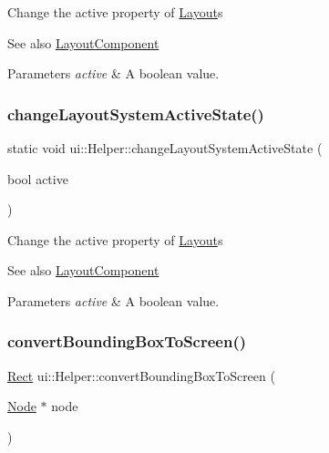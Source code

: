 Change the active property of \hyperlink{classui_1_1Layout}{Layout}\textquotesingle{}s \begin{DoxySeeAlso}{See also}
{\ttfamily \hyperlink{classui_1_1LayoutComponent}{Layout\+Component}} 
\end{DoxySeeAlso}

\begin{DoxyParams}{Parameters}
{\em active} & A boolean value. \\
\hline
\end{DoxyParams}
\mbox{\label{classui_1_1Helper_adf5b8619840884b66927f99c9cfbc813}} 
\subsubsection{\texorpdfstring{change\+Layout\+System\+Active\+State()}{changeLayoutSystemActiveState()}\hspace{0.1cm}{\footnotesize\ttfamily [2/2]}}
{\footnotesize\ttfamily static void ui\+::\+Helper\+::change\+Layout\+System\+Active\+State (\begin{DoxyParamCaption}\item[{bool}]{active }\end{DoxyParamCaption})\hspace{0.3cm}{\ttfamily [static]}}

Change the active property of \hyperlink{classui_1_1Layout}{Layout}\textquotesingle{}s \begin{DoxySeeAlso}{See also}
{\ttfamily \hyperlink{classui_1_1LayoutComponent}{Layout\+Component}} 
\end{DoxySeeAlso}

\begin{DoxyParams}{Parameters}
{\em active} & A boolean value. \\
\hline
\end{DoxyParams}
\mbox{\label{classui_1_1Helper_ada032a9b0238bc9eea83b67da612732a}} 
\subsubsection{\texorpdfstring{convert\+Bounding\+Box\+To\+Screen()}{convertBoundingBoxToScreen()}\hspace{0.1cm}{\footnotesize\ttfamily [1/2]}}
{\footnotesize\ttfamily \hyperlink{classRect}{Rect} ui\+::\+Helper\+::convert\+Bounding\+Box\+To\+Screen (\begin{DoxyParamCaption}\item[{\hyperlink{classNode}{Node} $\ast$}]{node }\end{DoxyParamCaption})\hspace{0.3cm}{\ttfamily [static]}}




